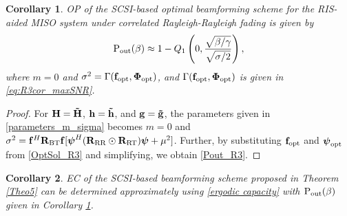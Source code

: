 \documentclass[journal,draftclsnofoot,onecolumn,12pt]{IEEEtran}
\newtheorem{corollary}{Corollary}[theorem]
\begin{document}
\vspace{-0.3cm}
\begin{corollary}\label{cor:outage_R3cor}
    OP of the SCSI-based optimal beamforming scheme for the RIS-aided MISO system under correlated Rayleigh-Rayleigh fading is given by
    \begin{align}
        {\rm P_{out}}(\beta) \approx 1-Q_1\left(0,\frac{\sqrt{\beta/\gamma}}{\sqrt{\sigma/2}}\right),\label{Pout_R3}
    \end{align}
    where  $ m =0$ and $\sigma^2 =  \Gamma(\mathbf{f}_{\rm opt},\mathbf{\Phi}_{\rm opt})$, and  $\Gamma(\mathbf{f}_{\rm opt},\mathbf{\Phi}_{\rm opt})$ is given in \eqref{eq:R3cor_maxSNR}.
\end{corollary}
\begin{proof}
    For $\mathbf{H} = \mathbf{\Tilde{H}}$, $\mathbf{h} = \mathbf{\Tilde{h}}$, and $\mathbf{g} = \mathbf{\Tilde{g}}$, the parameters given in \eqref{parameters_m_sigma} becomes $m = 0$ and $\sigma^2 = \mathbf{f}^H\mathbf{R}_{\rm BT}\mathbf{f}[\boldsymbol{\psi}^H(\mathbf{R}_{\rm RR}\odot\mathbf{R}_{\rm RT})\boldsymbol{\psi}+\mu^2]$. Further, by substituting $\mathbf{f}_{\rm opt}$ and $\mathbf{\boldsymbol{\psi}_{\rm opt}}$ from \eqref{OptSol_R3} and simplifying, we obtain \eqref{Pout_R3}.
\end{proof}
\vspace{-0.3cm}
\begin{corollary}
    EC of the SCSI-based  beamforming scheme proposed in  Theorem \ref{Theo5} can be determined approximately using \eqref{ergodic capacity} with ${\rm P_{out}}(\beta)$ given in Corollary \ref{cor:outage_R3cor}.
\end{corollary}
\vspace{-0.6cm}
\end{document}
